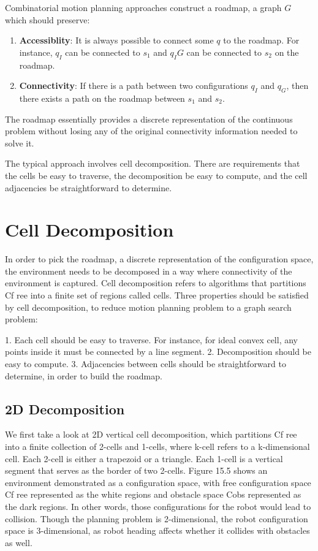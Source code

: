 \documentclass[twoside]{article}
\begin{document}
Combinatorial motion planning approaches construct a roadmap, a graph $G$ which should preserve:

\begin{enumerate}
	\item \textbf{Accessiblity}: It is always possible to connect some $q$ to the roadmap. For instance, $q_I$ can be connected to $s_1$ and $q_IG$ can be connected to $s_2$ on the roadmap.
	\item \textbf{Connectivity}: If there is a path between two configurations $q_I$ and $q_G$, then there exists a path on the roadmap between $s_1$ and $s_2$.
\end{enumerate}

The roadmap essentially provides a discrete representation of the continuous problem without losing any of the original connectivity information needed to solve it.

The typical approach involves cell decomposition. There are requirements that the cells be easy to traverse, the decomposition be easy to compute, and the cell adjacencies be straightforward to determine.

\section{Cell Decomposition}
In order to pick the roadmap, a discrete representation of the configuration space, the environment needs to be decomposed in a way where connectivity of the environment is captured. Cell decomposition refers to algorithms that partitions Cf ree into a finite set of regions called cells. Three properties should be satisfied by cell decomposition, to reduce motion planning problem to a graph search problem:

1. Each cell should be easy to traverse. For instance, for ideal convex cell, any points inside it must be connected by a line segment.
2. Decomposition should be easy to compute.
3. Adjacencies between cells should be straightforward to determine, in order to build the roadmap.

\subsection{2D Decomposition}
We first take a look at 2D vertical cell decomposition, which partitions Cf ree into a finite collection of 2-cells and 1-cells, where k-cell refers to a k-dimensional cell. Each 2-cell is either a trapezoid or a triangle.
Each 1-cell is a vertical segment that serves as the border of two 2-cells. Figure 15.5 shows an environment demonstrated as a configuration space, with free configuration space Cf ree represented as the white regions and obstacle space Cobs represented as the dark regions. In other words, those configurations for the robot would lead to collision. Though the planning problem is 2-dimensional, the robot configuration space is 3-dimensional, as robot heading affects whether it collides with obstacles as well.
\end{document}
